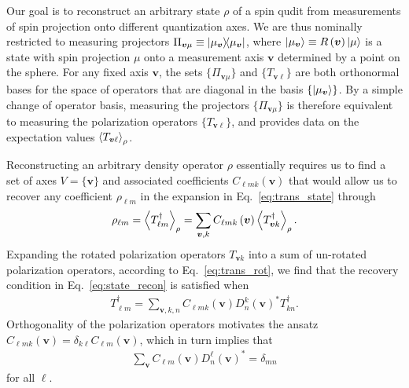 \documentclass[notitlepage,twocolumn]{revtex4-2}
\newcommand{\p}[1]{\left(#1\right)} %
\newcommand{\bk}{\Braket} %
\renewcommand{\v}{\bm} %
\renewcommand{\set}[1]{\{#1\}} %
\begin{document}

Our goal is to reconstruct an arbitrary state $\rho$ of a spin qudit from measurements of spin projection onto different quantization axes.
We are thus nominally restricted to measuring projectors $\Pi_{\v v\mu} \equiv \op{\mu_{\v v}}$, where $\ket{\mu_{\v v}}\equiv R\p{\v v}\ket{\mu}$ is a state with spin projection $\mu$ onto a measurement axis $\v v$ determined by a point on the sphere.
For any fixed axis $\v v$, the sets $\set{\Pi_{\v v\mu}}$ and $\set{T_{\v v\ell}}$ are both orthonormal bases for the space of operators that are diagonal in the basis $\set{\ket{\mu_{\v v}}}$.
By a simple change of operator basis, measuring the projectors $\set{\Pi_{\v v\mu}}$ is therefore equivalent to measuring the polarization operators $\set{T_{\v v\ell}}$, and provides data on the expectation values $\bk{T_{\v v\ell}}_\rho$.

Reconstructing an arbitrary density operator $\rho$ essentially requires us to find a set of axes $V=\set{\v v}$ and associated coefficients $C_{\ell mk}\p{\v v}$ that would allow us to recover any coefficient $\rho_{\ell m}$ in the expansion in Eq.~\eqref{eq:trans_state} through
\begin{align}
  \rho_{\ell m} = \bk{T_{\ell m}^\dag}_\rho
  = \sum_{\v v,k} C_{\ell mk}\p{\v v} \bk{T_{\v vk}^\dag}_\rho.
  \label{eq:state_recon}
\end{align}
Expanding the rotated polarization operators $T_{\v vk}$ into a sum of un-rotated polarization operators, according to Eq.~\eqref{eq:trans_rot}, we find that the recovery condition in Eq.~\eqref{eq:state_recon} is satisfied when
\begin{align}
  T_{\ell m}^\dag
  = \sum_{\v v,k,n} C_{\ell mk}\p{\v v}
  D^k_n\p{\v v}^* T_{kn}^\dag.
\end{align}
Orthogonality of the polarization operators motivates the ansatz $C_{\ell mk}\p{\v v}=\delta_{k\ell}C_{\ell m}\p{\v v}$, which in turn implies that
\begin{align}
  \sum_{\v v} C_{\ell m}\p{\v v} D^\ell_n\p{\v v}^* = \delta_{mn}
  \label{eq:tomo_recovery}
\end{align}
for all $\ell$.
\end{document}
